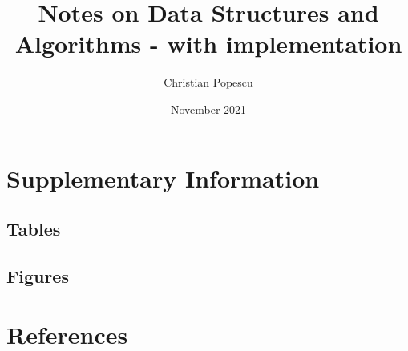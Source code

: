 \documentclass[a4paper,12pt]{book}
\begin{document}
\author{Christian Popescu}
\title{Notes on Data Structures and Algorithms - with implementation}
\date{November 2021}

\frontmatter
\maketitle
\tableofcontents
\setcounter{secnumdepth}{5}

\mainmatter














\backmatter
\begin{appendices}
	
	\chapter{Supplementary Information}
	
	\section{Tables}
	
	\section{Figures}
	
	\chapter{References}
	
\printbibliography
%	
	
\end{appendices}
\end{document}
